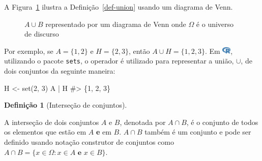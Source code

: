 \documentclass[
  letterpaper,
]{book}
\newenvironment{Shaded}{\begin{snugshade}}{\end{snugshade}}
\newcommand{\CommentTok}[1]{\textcolor[rgb]{0.37,0.37,0.37}{#1}}
\newcommand{\DecValTok}[1]{\textcolor[rgb]{0.68,0.00,0.00}{#1}}
\newcommand{\FunctionTok}[1]{\textcolor[rgb]{0.28,0.35,0.67}{#1}}
\newcommand{\NormalTok}[1]{\textcolor[rgb]{0.00,0.23,0.31}{#1}}
\newcommand{\OtherTok}[1]{\textcolor[rgb]{0.00,0.23,0.31}{#1}}
\newcommand{\SpecialCharTok}[1]{\textcolor[rgb]{0.37,0.37,0.37}{#1}}
\theoremstyle{definition}
\newtheorem{definition}{Definição}[chapter]
\theoremstyle{plain}
\theoremstyle{remark}
\begin{document}
A Figura~\ref{fig-union-venn-diagram} ilustra a
Definição~\ref{def-union} usando um diagrama de Venn.

\begin{figure}


\caption{\label{fig-union-venn-diagram}\(A \cup B\) representado por um
diagrama de Venn onde \(\Omega\) é o universo de discurso}

\end{figure}%

Por exemplo, se \(A = \{ 1, 2 \}\) e \(H = \{ 2, 3 \}\), então
\(A \cup H = \{ 1, 2, 3 \}\). Em
\includegraphics[width=1.13em,height=1em]{naive_set_theory_files/figure-pdf/fa-icon-9b00320707d42527dde67262afb33ded.pdf},
utilizando o pacote \texttt{sets}, o operador \texttt{\textbar{}} é
utilizado para representar a união, \(\cup\), de dois conjuntos da
seguinte maneira:

\begin{Shaded}
\begin{Highlighting}[]
\NormalTok{H }\OtherTok{\textless{}{-}} \FunctionTok{set}\NormalTok{(}\DecValTok{2}\NormalTok{, }\DecValTok{3}\NormalTok{)}
\NormalTok{A }\SpecialCharTok{|}\NormalTok{ H}
\CommentTok{\#\textgreater{} \{1, 2, 3\}}
\end{Highlighting}
\end{Shaded}

\begin{definition}[Interseção de
conjuntos]\protect\hypertarget{def-intersection}{}\label{def-intersection}

A interseção de dois conjuntos \(A\) e \(B\), denotada por \(A \cap B\),
é o conjunto de todos os elementos que estão em \(A\) \textbf{e} em
\(B\). \(A \cap B\) também é um conjunto e pode ser definido usando
notação construtor de conjuntos como
\(A \cap B = \{ x \in \Omega : x \in A \textbf{ e } x \in B \}\).

\end{definition}
\end{document}
